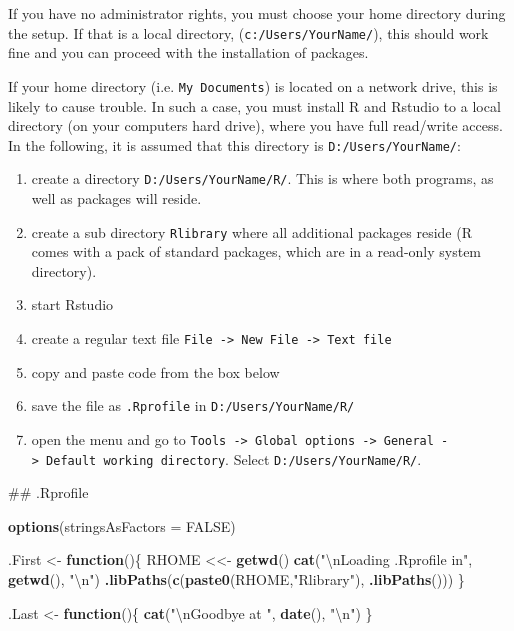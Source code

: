 \documentclass[]{svmono}
\newenvironment{Shaded}{\begin{snugshade}}{\end{snugshade}}
\newcommand{\KeywordTok}[1]{\textcolor[rgb]{0.13,0.29,0.53}{\textbf{#1}}}
\newcommand{\DataTypeTok}[1]{\textcolor[rgb]{0.13,0.29,0.53}{#1}}
\newcommand{\CharTok}[1]{\textcolor[rgb]{0.31,0.60,0.02}{#1}}
\newcommand{\StringTok}[1]{\textcolor[rgb]{0.31,0.60,0.02}{#1}}
\newcommand{\OtherTok}[1]{\textcolor[rgb]{0.56,0.35,0.01}{#1}}
\newcommand{\ControlFlowTok}[1]{\textcolor[rgb]{0.13,0.29,0.53}{\textbf{#1}}}
\newcommand{\NormalTok}[1]{#1}
\providecommand{\tightlist}{%
  \setlength{\itemsep}{0pt}\setlength{\parskip}{0pt}}
\begin{document}
If you have no administrator rights, you must choose your home directory
during the setup. If that is a local directory,
(\texttt{c:/Users/YourName/}), this should work fine and you can proceed
with the installation of packages.

If your home directory (i.e. \texttt{My\ Documents}) is located on a
network drive, this is likely to cause trouble. In such a case, you must
install R and Rstudio to a local directory (on your computers hard
drive), where you have full read/write access. In the following, it is
assumed that this directory is \texttt{D:/Users/YourName/}:

\begin{enumerate}
\def\labelenumi{\arabic{enumi}.}
\tightlist
\item
  create a directory \texttt{D:/Users/YourName/R/}. This is where both
  programs, as well as packages will reside.
\item
  create a sub directory \texttt{Rlibrary} where all additional packages
  reside (R comes with a pack of standard packages, which are in a
  read-only system directory).
\item
  start Rstudio
\item
  create a regular text file
  \texttt{File\ -\textgreater{}\ New\ File\ -\textgreater{}\ Text\ file}
\item
  copy and paste code from the box below
\item
  save the file as \texttt{.Rprofile} in \texttt{D:/Users/YourName/R/}
\item
  open the menu and go to
  \texttt{Tools\ -\textgreater{}\ Global\ options\ -\textgreater{}\ General\ -\textgreater{}\ Default\ working\ directory}.
  Select \texttt{D:/Users/YourName/R/}.
\end{enumerate}

\begin{Shaded}
\begin{Highlighting}[]
\NormalTok{## .Rprofile}

\KeywordTok{options}\NormalTok{(}\DataTypeTok{stringsAsFactors =} \OtherTok{FALSE}\NormalTok{)}

\NormalTok{.First <-}\StringTok{ }\ControlFlowTok{function}\NormalTok{()\{}
\NormalTok{  RHOME <<-}\StringTok{ }\KeywordTok{getwd}\NormalTok{()}
    \KeywordTok{cat}\NormalTok{(}\StringTok{"}\CharTok{\textbackslash{}n}\StringTok{Loading .Rprofile in"}\NormalTok{, }\KeywordTok{getwd}\NormalTok{(), }\StringTok{"}\CharTok{\textbackslash{}n}\StringTok{"}\NormalTok{)}
  \KeywordTok{.libPaths}\NormalTok{(}\KeywordTok{c}\NormalTok{(}\KeywordTok{paste0}\NormalTok{(RHOME,}\StringTok{"Rlibrary"}\NormalTok{), }\KeywordTok{.libPaths}\NormalTok{()))}
\NormalTok{\}}

\NormalTok{.Last <-}\StringTok{ }\ControlFlowTok{function}\NormalTok{()\{ }
  \KeywordTok{cat}\NormalTok{(}\StringTok{"}\CharTok{\textbackslash{}n}\StringTok{Goodbye at "}\NormalTok{, }\KeywordTok{date}\NormalTok{(), }\StringTok{"}\CharTok{\textbackslash{}n}\StringTok{"}\NormalTok{)}
\NormalTok{\}}
\end{Highlighting}
\end{Shaded}
\end{document}
